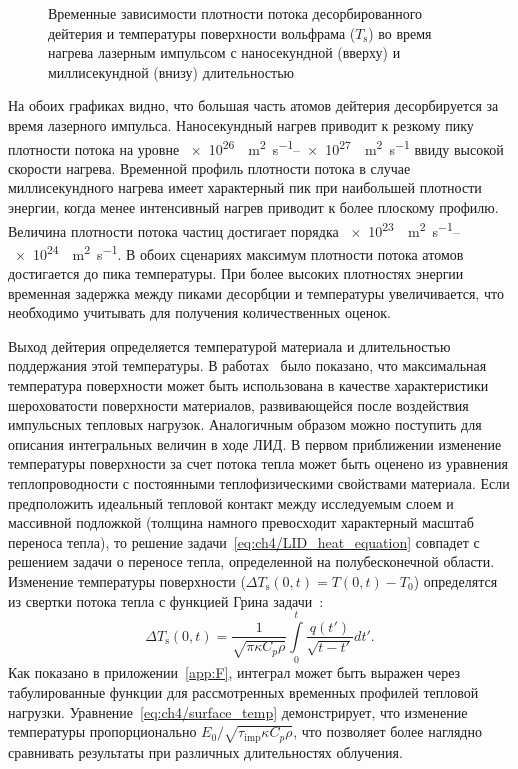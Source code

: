 \begin{figure}[ht]
    \caption{Временные зависимости плотности потока десорбированного дейтерия и температуры поверхности вольфрама ($T_\mathrm{s}$) во время нагрева лазерным импульсом с наносекундной (вверху) и миллисекундной (внизу) длительностью}\label{fig:ch4/LID_flux}
\end{figure}

На обоих графиках видно, что большая часть атомов дейтерия десорбируется за время лазерного импульса. Наносекундный нагрев приводит к резкому пику плотности потока на уровне \SIrange{e26}{e27}{\per\meter\squared\per\second} ввиду высокой скорости нагрева. Временной профиль плотности потока в случае миллисекундного нагрева имеет характерный пик при наибольшей плотности энергии, когда менее интенсивный нагрев приводит к более плоскому профилю. Величина плотности потока частиц достигает порядка \SIrange{e23}{e24}{\per\meter\squared\per\second}. В обоих сценариях максимум плотности потока атомов достигается до пика температуры. При более высоких плотностях энергии временная задержка между пиками десорбции и температуры увеличивается, что необходимо учитывать для получения количественных оценок.

Выход дейтерия определяется температурой материала и длительностью поддержания этой температуры. В работах~\cite{VanEden2014,Yu2015} было показано, что максимальная температура поверхности может быть использована в качестве характеристики шероховатости поверхности материалов, развивающейся после воздействия импульсных тепловых нагрузок. Аналогичным образом можно поступить для описания интегральных величин в ходе ЛИД. В первом приближении изменение температуры поверхности за счет потока тепла может быть оценено из уравнения теплопроводности с постоянными теплофизическими свойствами материала. Если предположить идеальный тепловой контакт между исследуемым слоем и массивной подложкой (толщина намного превосходит характерный масштаб переноса тепла), то решение задачи~\cref{eq:ch4/LID_heat_equation} совпадет с решением задачи о переносе тепла, определенной на полубесконечной области. Изменение температуры поверхности (\( \Delta T_\mathrm{s}(0,t) = T(0,t)-T_0\)) определятся из свертки потока тепла с функцией Грина задачи~\cite{Bechtel1975}:
\begin{equation}
    \label{eq:ch4/surface_temp}
    \Delta T_\mathrm{s}(0,t) = \frac{1}{\sqrt{\pi \kappa C_p \rho}} \int\limits_0^t \frac{q(t')}{\sqrt{t-t'}}dt'.
\end{equation}
Как показано в приложении~\cref{app:F}, интеграл может быть выражен через табулированные функции для рассмотренных временных профилей тепловой нагрузки. Уравнение~\cref{eq:ch4/surface_temp} демонстрирует, что изменение температуры пропорционально \( E_0 /\sqrt{\tau_\mathrm{imp}\kappa C_p \rho} \), что позволяет более наглядно сравнивать результаты при различных длительностях облучения.

